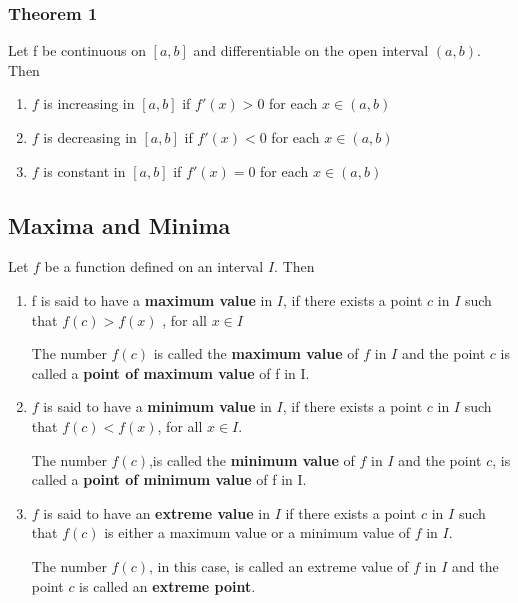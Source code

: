 \documentclass[12pt]{article}
\begin{document}
    \subsubsection*{Theorem 1}
    Let f be continuous on $[a, b]$ and differentiable on the open interval
$(a,b)$. Then \begin{enumerate}
    \item $f$ is increasing in $[a,b]$ if $f'(x) > 0$ for each $x \in(a, b)$
    \item $f$ is decreasing in $[a,b]$ if $f'(x) < 0$ for each $x \in(a, b)$
    \item $f$ is constant in $[a,b]$ if $f'(x) = 0$ for each $x \in(a, b)$


\end{enumerate}

\subsection*{Maxima and Minima}
Let $f$ be a function defined on an interval $I$. Then \begin{enumerate}
    \item f is said to have a \textbf{maximum value} in $I$, if there exists a point $c$ in $I$ such that
    $f (c) > f ( x )$ , for all $x \in I$

    The number $f (c)$ is called the \textbf{maximum value} of $f$ in $I$ and the point $c$ is called a
\textbf{point of maximum value} of f in I.

    \item $f$ is said to have a \textbf{minimum value} in $I$, if there exists a point $c$ in $I$ such that
    $f (c) < f (x)$, for all $x \in I$.

    The number $f (c)$,is called the \textbf{minimum value} of $f$ in $I$ and the point
$c$, is called a \textbf{point of minimum value} of f in I.
\item $f$ is said to have an \textbf{extreme value} in $I$ if there exists a point $c$ in $I$ such that
$f (c)$ is either a maximum value or a minimum value of $f$ in $I$.

The number $f (c)$, in this case, is called an extreme value of $f$ in $I$ and the point $c$
is called an \textbf{extreme point}.



\end{enumerate}
\end{document}
